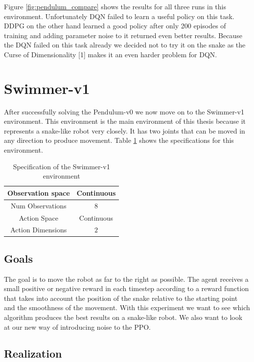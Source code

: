 Figure \ref{fig:pendulum_compare} shows the results for all three runs in this environment.
Unfortunately DQN failed to learn a useful policy on this task.
DDPG on the other hand learned a good policy after only 200 episodes of training and adding parameter
noise to it returned even better results. Because the DQN failed on this task
already we decided not to try it on the snake as the Curse of Dimensionality [1] makes it
an even harder problem for DQN.

\section{Swimmer-v1}

After successfully solving the Pendulum-v0 we now move on to the Swimmer-v1 environment.
This environment is the main environment of this thesis because it represents a snake-like robot very closely.
It has two joints that can be moved in any direction to produce movement. Table \ref{tb:swimmer_specs} shows the specifications for this environment.

\begin{table}[H]
  \centering
  \begin{tabular}{| c | c |}
      \hline
      Observation space & Continuous\\
      \hline
      Num Observations & $8$\\
      \hline
      Action Space & Continuous\\
      \hline
      Action Dimensions & $2$\\
      \hline
  \end{tabular}
\caption{Specification of the Swimmer-v1 environment}
\label{tb:swimmer_specs}
\end{table}


\subsection{Goals}

The goal is to move the robot as far to the right as possible. The agent receives a small positive or negative reward in each timestep according to a reward function that takes into account the position of the snake relative to the starting point and the smoothness of the movement.
With this experiment we want to see which algorithm produces the best results on a snake-like robot.
We also want to look at our new way of introducing noise to the PPO.

\subsection{Realization}

